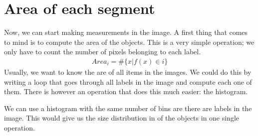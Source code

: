 \documentclass[letterpaper,10pt,english]{sphinxmanual}
\begin{document}
\begin{sphinxVerbatim}[commandchars=\\\{\}]
        
 
  
 
\end{sphinxVerbatim}

\noindent{}


\section{Area of each segment}
\label{\detokenize{06-ShapeAnalysis:area-of-each-segment}}
\sphinxAtStartPar
Now, we can start making measurements in the image. A first thing that comes to mind is to compute the area of the objects. This is a very simple operation; we only have to count the number of pixels belonging to each label.
\begin{equation*}
\begin{split}Area_i=\#\{x|f(x)\in{}i\}\end{split}
\end{equation*}
\sphinxAtStartPar
Usually, we want to know the are of all items in the images. We could do this by writing a loop that goes through all labels in the image and compute each one of them. There is however an operation that does this much easier: the histogram.

\sphinxAtStartPar
We can use a histogram with the same number of bins are there are labels in the image. This would give us the size distribution in of the objects in one single operation.
\end{document}
